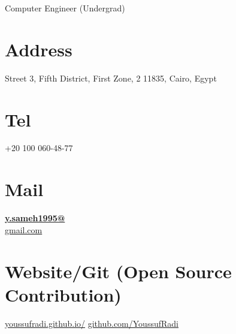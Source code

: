\documentclass[]{friggeri-cv}
\begin{document}
      {Computer Engineer (Undergrad)}
      

\begin{aside}
  \section{Address}
    Street 3, Fifth District, First Zone, 2
    11835, Cairo, Egypt
    ~
  \section{Tel }
    +20 100 060-48-77
    ~
  \section{Mail}
    \href{mailto:y.sameh1995@gmail.com}{\textbf{y.sameh1995@}\\gmail.com}
    ~
  \section{Website/Git (Open Source Contribution)}
    \href{https://youssufradi.github.io/}{youssufradi.github.io/}
    \href{https://github.com/YoussufRadi}{github.com/YoussufRadi}
    ~

\end{aside}
\end{document}
